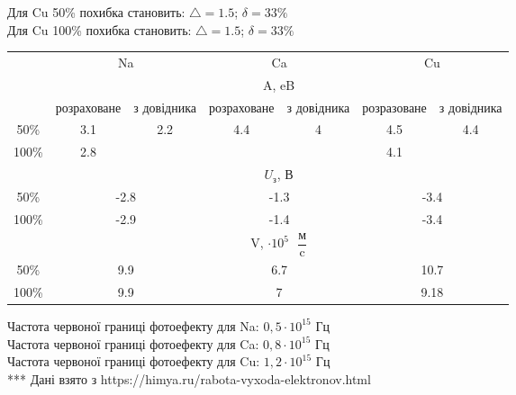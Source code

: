 \documentclass[a4paper,14pt]{extreport}
\begin{document}
	Для Cu 50\% похибка становить: $\triangle = 1.5$; $\delta = 33\%$\\
	Для Cu 100\% похибка становить: $\triangle = 1.5$; $\delta = 33\%$\\
	
	
	\begin{table}[h]
	\begin{small}
		\begin{tabular}{|c|c|c|c|c|c|c|}
\hline
\multicolumn{1}{|l|}{\multirow{3}{*}{}} & \multicolumn{2}{c|}{Na} & \multicolumn{2}{c|}{Ca} & \multicolumn{2}{c|}{Cu} \\ \cline{2-7} 
\multicolumn{1}{|l|}{} & \multicolumn{6}{c|}{A, eB} \\ \cline{2-7} 
\multicolumn{1}{|l|}{} & розраховане & з довідника & розраховане & з довідника & розразоване & з довідника \\ \hline
50\% & 3.1 & \multirow{2}{*}{2.2} & \multirow{2}{*}{4.4} & \multirow{2}{*}{4} & 4.5 & \multirow{2}{*}{4.4} \\ \cline{1-2} \cline{6-6}
100\% & 2.8 &  &  &  & 4.1 &  \\ \hline
\multicolumn{1}{|l|}{} & \multicolumn{6}{c|}{$U_{\text{з}}$,  В} \\ \hline
50\% & \multicolumn{2}{c|}{-2.8} & \multicolumn{2}{c|}{-1.3} & \multicolumn{2}{c|}{-3.4} \\ \hline
100\% & \multicolumn{2}{c|}{-2.9} & \multicolumn{2}{c|}{-1.4} & \multicolumn{2}{c|}{-3.4} \\ \hline
\multicolumn{1}{|l|}{} & \multicolumn{6}{c|}{V,  $\cdot 10^{5}  \text{ }\dfrac{\text{м}}{\text{c}}$} \\ \hline
50\% & \multicolumn{2}{c|}{9.9} & \multicolumn{2}{c|}{6.7} & \multicolumn{2}{c|}{10.7} \\ \hline
100\% & \multicolumn{2}{c|}{9.9} & \multicolumn{2}{c|}{7} & \multicolumn{2}{c|}{9.18} \\ \hline
\end{tabular}	
		\end{small}
	\end{table}
	Частота червоної границі фотоефекту для Na: $ 0,5 \cdot 10^{15} $ Гц\\
	Частота червоної границі фотоефекту для Ca: $ 0,8 \cdot 10^{15} $ Гц\\
	Частота червоної границі фотоефекту для Cu: $ 1,2 \cdot 10^{15} $ Гц\\
*** Дані взято з  https://himya.ru/rabota-vyxoda-elektronov.html
 
\end{document}

